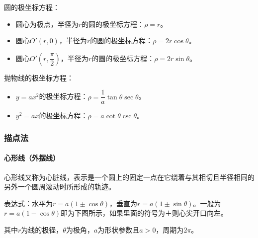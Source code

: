 \documentclass[UTF8, 12pt]{ctexart}
\begin{document}
圆的极坐标方程：

\begin{itemize}
    \item 圆心为极点，半径为$r$的圆的极坐标方程：$\rho=r$。
    \item 圆心$O'(r,0)$，半径为$r$的圆的极坐标方程：$\rho=2r\cos\theta$。
    \item 圆心$O'\left(r,\dfrac{\pi}{2}\right)$，半径为$r$的圆的极坐标方程：$\rho=2r\sin\theta$。
\end{itemize}

抛物线的极坐标方程：

\begin{itemize}
    \item $y=ax^2$的极坐标方程：$\rho=\dfrac{1}{a}\tan\theta\sec\theta$。
    \item $y^2=ax$的极坐标方程：$\rho=a\cot\theta\csc\theta$。
\end{itemize}

\subsubsection{描点法}
\paragraph{心形线（外摆线）} \leavevmode \medskip

\begin{minipage}{0.55\linewidth}
    心形线又称为心脏线，表示是一个圆上的固定一点在它绕着与其相切且半径相同的另外一个圆周滚动时所形成的轨迹。

    表达式：水平为$r=a(1\pm\cos\theta)$，垂直为$r=a(1\pm\sin\theta)$。一般为$r=a(1-\cos\theta)$即为下图所示，如果里面的符号为＋则心尖开口向左。

    其中$r$为线的极径，$\theta$为极角，$a$为形状参数且$a>0$，周期为$2\pi$。
\end{minipage}
\hfill
\begin{minipage}{0.35\linewidth}
\end{minipage}
\end{document}
